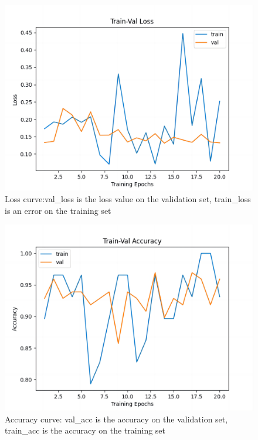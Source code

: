 \documentclass[11pt,a4paper]{article}
\begin{document}
\begin{spacing}{1.5}
\begin{figure}[htbp]
\centering
\includegraphics[scale=0.5]{Figure_1}
\caption{Loss curve:val\_loss is the loss value on the validation set, train\_loss is an error on the training set}
\label{Loss}
\end{figure}

\begin{figure}[htbp]
\centering
\includegraphics[scale=0.5]{accuracy}
\caption{Accuracy curve: val\_acc is the accuracy on the validation set, train\_acc is the accuracy on the training set}
\label{Accuracy}
\end{figure}



\end{spacing}
\end{document}
